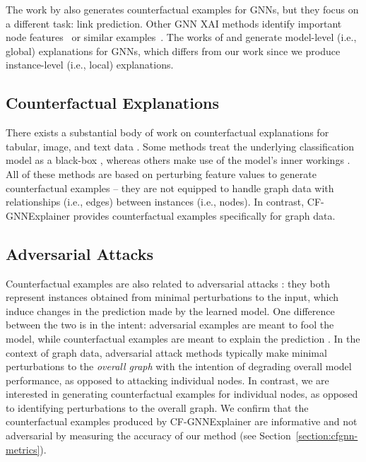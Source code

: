 \pagebreak

The work by \citet{kang_explaine_2019} also generates counterfactual examples for GNNs, but they focus on a different task: link prediction. 
Other GNN XAI methods identify important node features~\citep{huang_graphlime_2020} or similar examples~\citep{faber_contrastive_2020}. 
The works of \citet{yuan_xgnn_2020} and \citet{schnake_xai_2020} generate model-level (i.e., global) explanations for GNNs, which differs from our work since we produce instance-level (i.e., local) explanations. 

\subsection{Counterfactual Explanations}
\label{section:rw-cfexp}
There exists a substantial body of work on counterfactual explanations for tabular, image, and text data \citep{verma2020counterfactual,karimi2020survey,stepin2021survey}.
Some methods treat the underlying classification model as a black-box \citep{laugel_inverse_2017, guidotti_local_2018,lucic_2020_why}, whereas others make use of the model's inner workings \citep{tolomei_interpretable_2017, wachter_counterfactual_2017, ustun_actionable_2019, kanamori_dace_2020, lucic2020focus}.
All of these methods are based on perturbing feature values to generate counterfactual examples -- they are not equipped to handle graph data with relationships (i.e., edges) between instances (i.e., nodes). In contrast, CF-GNNExplainer provides counterfactual examples specifically for graph data. 



\subsection{Adversarial Attacks}
\label{section:rw-adversarial}
Counterfactual examples are also related to adversarial attacks \citep{sun2020adversarial}: they both represent instances obtained from minimal perturbations to the input, which induce changes in the prediction made by the learned model. 
One difference between the two is in the intent: adversarial examples are meant to fool the model, while counterfactual examples are meant to explain the prediction \citep{freiesleben_intriguing_2021,lucic2020focus}. 
In the context of graph data, adversarial attack methods typically make minimal perturbations to the \emph{overall graph} with the intention of degrading overall model performance, as opposed to attacking individual nodes. 
In contrast, we are interested in generating counterfactual examples for individual nodes, as opposed to identifying perturbations to the overall graph. 
We confirm that the counterfactual examples produced by CF-GNNExplainer are informative and not adversarial by measuring the accuracy of our method (see Section~\ref{section:cfgnn-metrics}). 


